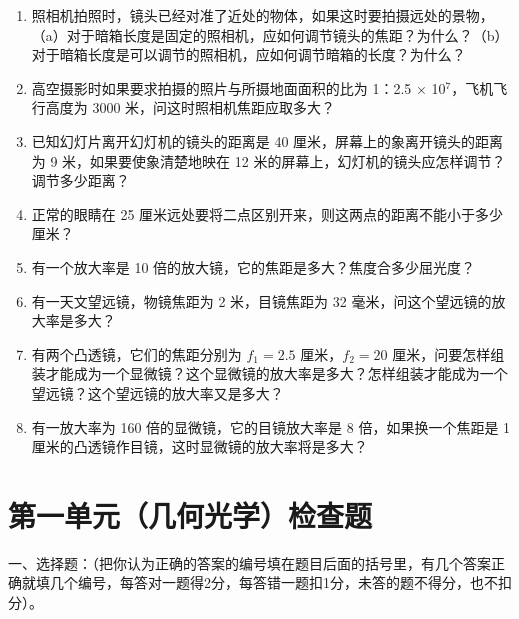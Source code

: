 \begin{enumerate}
\item
  照相机拍照时，镜头已经对准了近处的物体，如果这时要拍摄远处的景物，（a）对于暗箱长度是固定的照相机，应如何调节镜头的焦距？为什么？（b）对于暗箱长度是可以调节的照相机，应如何调节暗箱的长度？为什么？
\item
  高空摄影时如果要求拍摄的照片与所摄地面面积的比为 1：2.5 ×
  10\(^{7}\)，飞机飞行高度为 3000 米，问这时照相机焦距应取多大？
\item
  已知幻灯片离开幻灯机的镜头的距离是 40 厘米，屏幕上的象离开镜头的距离为
  9 米，如果要使象清楚地映在 12
  米的屏幕上，幻灯机的镜头应怎样调节？调节多少距离？
\item
  正常的眼睛在 25
  厘米远处要将二点区别开来，则这两点的距离不能小于多少厘米？
\item
  有一个放大率是 10 倍的放大镜，它的焦距是多大？焦度合多少屈光度？
\item
  有一天文望远镜，物镜焦距为 2 米，目镜焦距为 32
  毫米，问这个望远镜的放大率是多大？
\item
  有两个凸透镜，它们的焦距分别为 \(f_{1} = 2.5\) 厘米，\(f_{2} = 20\)
  厘米，问要怎样组装才能成为一个显微镜？这个显微镜的放大率是多大？怎样组装才能成为一个望远镜？这个望远镜的放大率又是多大？
\item
  有一放大率为 160 倍的显微镜，它的目镜放大率是 8 倍，如果换一个焦距是 1
  厘米的凸透镜作目镜，这时显微镜的放大率将是多大？
\end{enumerate}

\chapter{第一单元（几何光学）检查题}

一、选择题：（把你认为正确的答案的编号填在题目后面的括号里，有几个答案正确就填几个编号，每答对一题得2分，每答错一题扣1分，未答的题不得分，也不扣分）。

